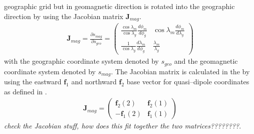 geographic grid but in geomagnetic direction is rotated into the
geographic direction by using the Jacobian matrix
$\mathbf{J}_{mag}$.
%
\begin{gather}
   \mathbf{J}_{mag} = \frac{\partial s_{mag}}{\partial s_{geo}} =
   \begin{pmatrix}
      \frac{\cos \lambda_m}{\cos \lambda_g} \frac{d \phi_m}{d \phi_g} & {\cos \lambda_m}\frac{d \phi_m}{d \lambda_g}\\
      \frac{1}{\cos \lambda_g} \frac{d \lambda_m}{d \phi_g}&\frac{\lambda_m}{\lambda_g}
   \end{pmatrix}
\end{gather}
%
with the geographic coordinate system denoted by $s_{geo}$ and the
geomagnetic coordinate system denoted by $s_{mag}$. The Jacobian
matrix is calculated in the  by using the
eastward $\mathbf{f}_1$ and northward $\mathbf{f}_2$ base vector for
quasi--dipole coordinates as defined in \cite{Richmond95}.
%
\begin{gather}
   \mathbf{J}_{mag} =
   \begin{pmatrix}
      \mathbf{f}_{2}(2) & \mathbf{f}_2(1)\\
      -\mathbf{f}_1(2)  & \mathbf{f}_1(1)
   \end{pmatrix}
\end{gather}
%
\emph{check the Jacobian stuff, how does this fit together the two
matrices????????}. \\

